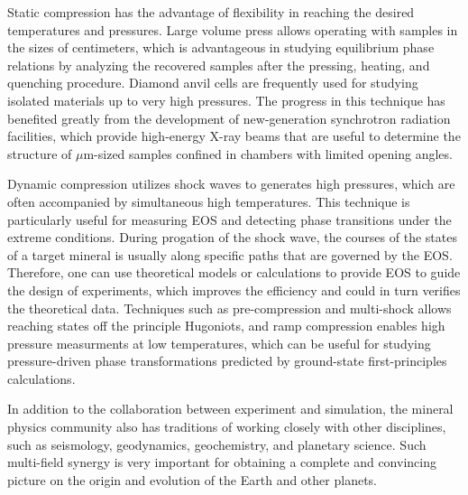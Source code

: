Static compression has the advantage of flexibility in reaching the desired temperatures and pressures. Large volume press allows operating with samples in the sizes of centimeters, which is advantageous in studying equilibrium phase relations by analyzing the recovered samples after the pressing, heating, and quenching procedure. Diamond anvil cells are frequently used for studying isolated materials up to very high pressures. The progress in this technique has benefited greatly from the development of new-generation synchrotron radiation facilities, which provide high-energy X-ray beams that are useful to determine the structure of $\mu$m-sized samples confined in chambers with limited opening angles. 

Dynamic compression utilizes shock waves to generates high pressures, which are often accompanied by simultaneous high temperatures. This technique is particularly useful for measuring EOS and detecting phase transitions under the extreme conditions. During progation of the shock wave, the courses of the states of a target mineral is usually along specific paths that are governed by the EOS. Therefore, one can use theoretical models or calculations to provide EOS to guide the design of experiments, which improves the efficiency and could in turn verifies the theoretical data. Techniques such as pre-compression and multi-shock allows reaching states off the principle Hugoniots, and ramp compression enables high pressure measurments at low temperatures, which can be useful for studying pressure-driven phase transformations predicted by ground-state first-principles calculations.

In addition to the collaboration between experiment and simulation, the mineral physics community also has traditions of working closely with other disciplines, such as seismology, geodynamics, geochemistry, and planetary science. Such multi-field synergy is very important for obtaining a complete and convincing picture on the origin and evolution of the Earth and other planets.



